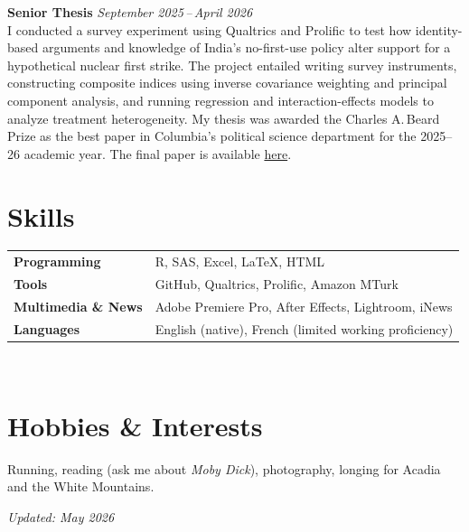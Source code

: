 \documentclass[11pt, letterpaper]{article}
\begin{document}
\textbf{Senior Thesis} \hfill \textit{September 2025\,--\,April 2026}\\
I conducted a survey experiment using Qualtrics and Prolific to test how identity-based arguments and knowledge of India's no-first-use policy alter support for a hypothetical nuclear first strike. The project entailed writing survey instruments, constructing composite indices using inverse covariance weighting and principal component analysis, and running regression and interaction-effects models to analyze treatment heterogeneity. My thesis was awarded the Charles A.\,Beard Prize as the best paper in Columbia's political science department for the 2025--26 academic year. The final paper is available \href{https://wmk2114.github.io/my-site/pdfs/Senior%20Thesis%20Wyatt%20King.pdf}{here}.

\section*{Skills}

\begin{tabular}{@{}ll}
  \textbf{Programming}  & R, SAS, Excel, \LaTeX, HTML \\[2pt]
  \textbf{Tools}        & GitHub, Qualtrics, Prolific, Amazon MTurk \\[2pt]
  \textbf{Multimedia \& News} & Adobe Premiere Pro, After Effects, Lightroom, iNews \\[2pt]
  \textbf{Languages}    & English (native), French (limited working proficiency) \\
\end{tabular} \\
\section*{Hobbies \& Interests}
Running, reading (ask me about \textit{Moby Dick}), photography, longing for Acadia and the White Mountains.


\textit{Updated: May 2026}
\end{document}
